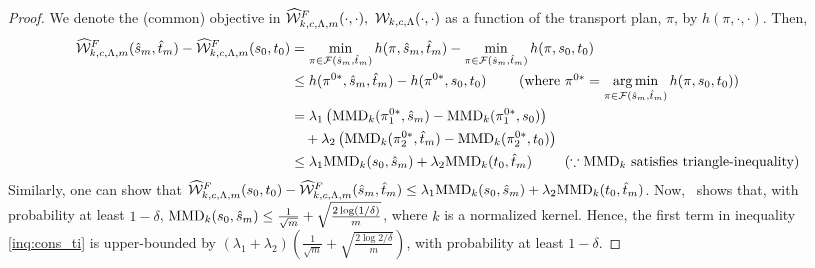 \begin{proof}
We denote the (common) objective in $\widehat{\mathcal{W}}^F_{k, c, \Lambda, m}(\cdot,\cdot),\ \mathcal{W}_{k, c, \Lambda}(\cdot,\cdot)$ as a function of the transport plan, $\pi$, by $h(\pi,\cdot,\cdot)$. Then,
\allowdisplaybreaks
\begin{align*}
\hatcalUF(\hat{s}_m,\hat{t}_m)-\hatcalUF(s_0, t_0)&=\min\limits_{\pi\in \calF(\hat{s}_m,\hat{t}_m)}h(\pi,\hat{s}_m,\hat{t}_m)-\min\limits_{\pi\in \calF(\hat{s}_m,\hat{t}_m)}h(\pi,s_0,t_0)\nonumber\\
    &\le h(\pi^{0*}, \hat{s}_m, \hat{t}_m) - h(\pi^{0*}, s_0, t_0) \ \tag{where $\pi^{0*} = \argmin_{\pi\in \calF(\hat{s}_m,\hat{t}_m)}h(\pi,s_0,t_0)$}\nonumber\\
    &= \lambda_1 \left( \MMD_k(\pi^{0*}_1,\hat{s}_m) - \MMD_k(\pi^{0*}_1,s_0)\right) \\&\quad + \lambda_2\left( 
    \MMD_k(\pi^{0*}_2,\hat{t}_m) - \MMD_k(\pi^{0*}_2,t_0) \right)\nonumber \\
    & \le \lambda_1 \MMD_k(s_0,\hat{s}_m) + \lambda_2 \MMD_k(t_0,\hat{t}_m)\ \tag{$\because \MMD_k$ satisfies triangle-inequality} 
\end{align*}
Similarly, one can show that $\widehat{\mathcal{W}}^F_{k, c, \Lambda, m}(s_0, t_0)-\widehat{\mathcal{W}}^F_{k, c, \Lambda, m}(\hat{s}_m,\hat{t}_m)\leq \lambda_1 \textup{MMD}_k(s_0,\hat{s}_m) + \lambda_2 \textup{MMD}_k(t_0,\hat{t}_m)$. Now,~\citet[Theorem~3.4]{Muandet_2017} shows that, with probability at least $1-\delta$, $\textup{MMD}_k(s_0,\hat{s}_m)\le\frac{1}{\sqrt{m}}+\sqrt{\frac{2\log({1/\delta})}{m}}$, where $k$ is a normalized kernel. Hence, the first term in inequality \ref{inq:cons_ti} is upper-bounded by $(\lambda_1+\lambda_2)\left(\frac{1}{\sqrt{m}}+\sqrt{\frac{2\log{2/\delta}}{m}}\right)$, with probability at least $1-\delta$.


\end{proof}
